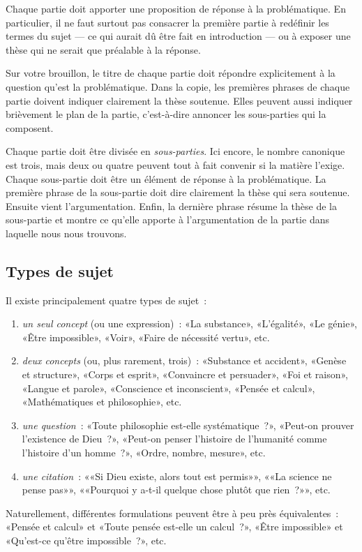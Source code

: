 \documentclass[a4paper,11pt]{article}
\begin{document}
\par

Chaque partie doit apporter une proposition de réponse à la
problématique. En particulier, il ne faut surtout pas consacrer la
première partie à redéfinir les termes du sujet --- ce qui aurait dû
être fait en introduction --- ou à exposer une thèse qui ne serait que
préalable à la réponse. 

\par

Sur votre brouillon, le titre de chaque partie doit répondre
explicitement à la question qu'est la problématique. Dans la copie, les
premières phrases de chaque partie doivent indiquer clairement la thèse
soutenue. Elles peuvent aussi indiquer brièvement le plan de la partie,
c'est-à-dire annoncer les sous-parties qui la composent.

\par

Chaque partie doit être divisée en \emph{sous-parties}. Ici encore, le
nombre canonique est trois, mais deux ou quatre peuvent tout à fait
convenir si la matière l'exige. Chaque sous-partie doit être un élément
de réponse à la problématique. La première phrase de la sous-partie doit
dire clairement la thèse qui sera soutenue. Ensuite vient
l'argumentation. Enfin, la dernière phrase résume la thèse de la
sous-partie et montre ce qu'elle apporte à l'argumentation de la partie
dans laquelle nous nous trouvons.



\subsection{Types de sujet}

Il existe principalement quatre types de sujet~: 
\begin{enumerate}
\item \emph{un seul concept} (ou une expression)~: «La substance»,
  «L'égalité», «Le génie», «Être impossible», «Voir», «Faire de
  nécessité vertu», etc.
\item \emph{deux concepts} (ou, plus rarement, trois)~: «Substance et
  accident», «Genèse et structure», «Corps et esprit», «Convaincre et
  persuader», «Foi et raison», «Langue et parole», «Conscience et
  inconscient», «Pensée et calcul», «Mathématiques et philosophie», etc.
\item \emph{une question}~: «Toute philosophie est-elle systématique~?»,
  «Peut-on prouver l'existence de Dieu~?», «Peut-on penser l'histoire de
  l'humanité comme l'histoire d'un homme~?», «Ordre, nombre, mesure»,
  etc.
\item \emph{une citation}~: ««Si Dieu existe, alors tout est permis»»,
  ««La science ne pense pas»», ««Pourquoi y a-t-il quelque chose plutôt
  que rien~?»», etc.
\end{enumerate}
Naturellement, différentes formulations peuvent être à peu près
équivalentes~: «Pensée et calcul» et «Toute pensée est-elle un
calcul~?», «Être impossible» et «Qu'est-ce qu'être impossible~?», etc.
\end{document}
